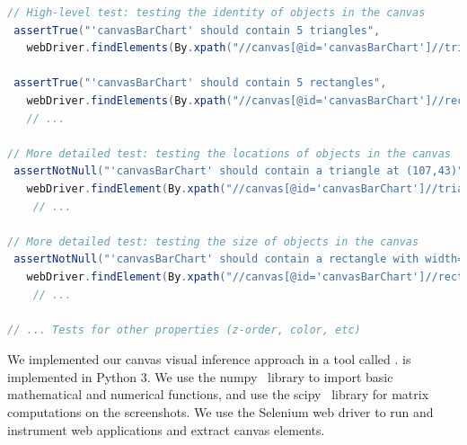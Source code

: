      \begin{lstlisting}[language=Java, float=*, caption={The automatically generated test assertions for the canvas element of the motivating example (Figure \ref{fig:motivating-example-1} and Listing \ref{lst:motivating-example-1})}, label={lst:generated-tests}]
// High-level test: testing the identity of objects in the canvas
 assertTrue("'canvasBarChart' should contain 5 triangles",
   webDriver.findElements(By.xpath("//canvas[@id='canvasBarChart']//triangle")).size() == 5);

 assertTrue("'canvasBarChart' should contain 5 rectangles",
   webDriver.findElements(By.xpath("//canvas[@id='canvasBarChart']//rectangle")).size() == 5);
   // ...

// More detailed test: testing the locations of objects in the canvas
 assertNotNull("'canvasBarChart' should contain a triangle at (107,43)",
   webDriver.findElement(By.xpath("//canvas[@id='canvasBarChart']//triangle[@center='(107,43)']")));
	// ...

// More detailed test: testing the size of objects in the canvas
 assertNotNull("'canvasBarChart' should contain a rectangle with width=86 and height=295",
   webDriver.findElement(By.xpath("//canvas[@id='canvasBarChart']//rectangle[@width='86' and @height='295']")));
	// ...

// ... Tests for other properties (z-order, color, etc)
     \end{lstlisting}
	

We implemented our canvas visual inference approach in a tool called \tool\cite{canvasure}. \tool is implemented in Python 3. We use the numpy~\cite{walt2011numpy} library to import basic mathematical and numerical functions, and use the scipy~\cite{jones2014scipy} library for matrix computations on the screenshots. We use the Selenium web driver to run and instrument web applications and extract canvas elements.


